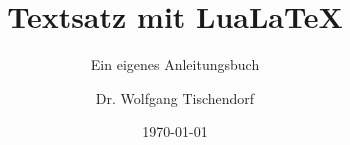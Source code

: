 \usepackage{fontspec}
\usepackage{libertinus}
\usepackage{microtype}
\usepackage{geometry}
\usepackage{babel}
\usepackage{blindtext}

\usepackage[autostyle]{csquotes}
\usepackage{eurosym}
\usepackage[colorlinks]{hyperref} %
\hypersetup{linkcolor=blue}
\title{Textsatz mit Lua\LaTeX}
\subtitle{Ein eigenes Anleitungsbuch}
\author{Dr. Wolfgang Tischendorf}
\date{\today}
